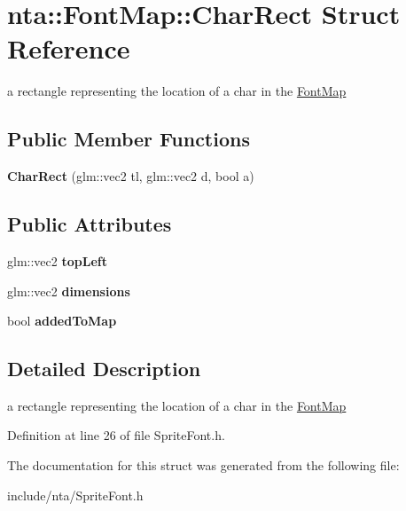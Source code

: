 \hypertarget{structnta_1_1FontMap_1_1CharRect}{}\section{nta\+:\+:Font\+Map\+:\+:Char\+Rect Struct Reference}
\label{structnta_1_1FontMap_1_1CharRect}


a rectangle representing the location of a char in the \hyperlink{classnta_1_1FontMap}{Font\+Map}  


\subsection*{Public Member Functions}
\begin{DoxyCompactItemize}
\item 
\mbox{\label{structnta_1_1FontMap_1_1CharRect_aae578d461eba96e8fbf71f507b99a87f}} 
{\bfseries Char\+Rect} (glm\+::vec2 tl, glm\+::vec2 d, bool a)
\end{DoxyCompactItemize}
\subsection*{Public Attributes}
\begin{DoxyCompactItemize}
\item 
\mbox{\label{structnta_1_1FontMap_1_1CharRect_a84c89136099916d5e825d487fec1fd50}} 
glm\+::vec2 {\bfseries top\+Left}
\item 
\mbox{\label{structnta_1_1FontMap_1_1CharRect_a3f5d24fdc091d334c532274b9a79fd0d}} 
glm\+::vec2 {\bfseries dimensions}
\item 
\mbox{\label{structnta_1_1FontMap_1_1CharRect_a605388f5ce8e4e7316276d9b0df740cb}} 
bool {\bfseries added\+To\+Map}
\end{DoxyCompactItemize}


\subsection{Detailed Description}
a rectangle representing the location of a char in the \hyperlink{classnta_1_1FontMap}{Font\+Map} 

Definition at line 26 of file Sprite\+Font.\+h.



The documentation for this struct was generated from the following file\+:\begin{DoxyCompactItemize}
\item 
include/nta/Sprite\+Font.\+h\end{DoxyCompactItemize}
